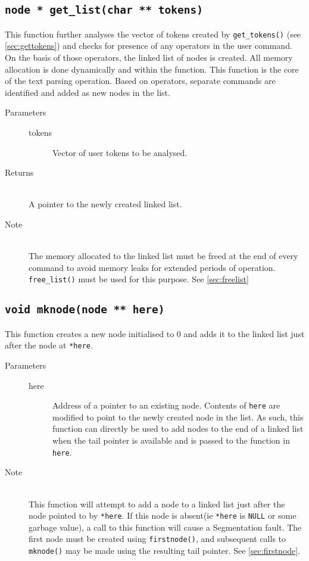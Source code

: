 \documentclass{article}
\begin{document}
\subsection{\lstinline{node * get_list(char ** tokens)}} \label{sec:getlist}
This function further analyses the vector of tokens created by \lstinline{get_tokens()} (see \ref{sec:gettokens}) and checks for presence of any operators in the user command. On the basis of those operators, the linked list of nodes is created. All memory allocation is done dynamically and within the function. This function is the core of the text parsing operation. Based on operators, separate commands are identified and added as new nodes in the list.
\begin{description}
	\item[Parameters]\hfill
	\begin{description}
		\item[tokens] Vector of user tokens to be analysed.
	\end{description}
	\item[Returns]\hfill\\
		A pointer to the newly created linked list.
	\item[Note]\hfill\\
		The memory allocated to the linked list must be freed at the end of every command to avoid memory leaks for extended periods of operation. \lstinline{free_list()} must be used for this purpose. See \ref{sec:freelist}
\end{description}

\subsection{\lstinline{void mknode(node ** here)}} \label{sec:mknode}
This function creates a new node initialised to 0 and adds it to the linked list just after the node at \lstinline{*here}.
\begin{description}
	\item[Parameters]\hfill
	\begin{description}
		\item[here] Address of a pointer to an existing node. Contents of \lstinline{here} are modified to point to the newly created node in the list. As such, this function can directly be used to add nodes to the end of a linked list when the tail pointer is available and is passed to the function in \lstinline{here}.
	\end{description}
	\item[Note]\hfill\\
		This function will attempt to add a node to a linked list just after the node pointed to by \lstinline{*here}. If this node is absent(ie \lstinline{*here} is \lstinline{NULL} or some garbage value), a call to this function will cause a Segmentation fault. The first node must be created using \lstinline{firstnode()}, and subsequent calls to \lstinline{mknode()} may be made using the resulting tail pointer. See \ref{sec:firstnode}.
\end{description}
\end{document}
